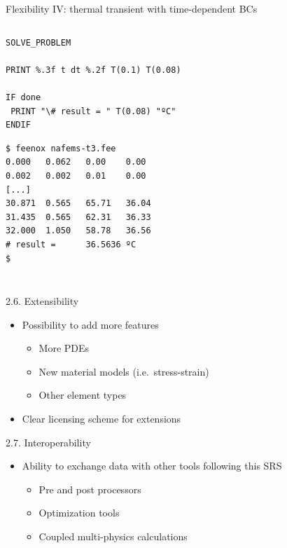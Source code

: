 \documentclass[
  ignorenonframetext,
  aspectratio=169,
]{beamer}
\providecommand{\tightlist}{%
  \setlength{\itemsep}{0pt}\setlength{\parskip}{0pt}}
\begin{document}
\begin{frame}[fragile]{Flexibility IV: thermal transient with
time-dependent BCs}
\begin{columns}[T]
\begin{column}{0.5\textwidth}
\begin{lstlisting}[style=feenox]
SOLVE_PROBLEM

PRINT %.3f t dt %.2f T(0.1) T(0.08) 

IF done
 PRINT "\# result = " T(0.08) "ºC"
ENDIF
\end{lstlisting}

\begin{lstlisting}[style=terminal]
$ feenox nafems-t3.fee 
0.000   0.062   0.00    0.00
0.002   0.002   0.01    0.00
[...]
30.871  0.565   65.71   36.04
31.435  0.565   62.31   36.33
32.000  1.050   58.78   36.56
# result =      36.5636 ºC
$
\end{lstlisting}
\end{column}
\end{columns}
\end{frame}

\begin{frame}{}
\protect\hypertarget{section-8}{}
\begin{columns}[T]
\begin{column}{0.5\textwidth}
\begin{block}{2.6. Extensibility}
\protect\hypertarget{extensibility}{}
\begin{itemize}
\tightlist
\item
  Possibility to add more features

  \begin{itemize}
  \tightlist
  \item
    More PDEs
  \item
    New material models (i.e.~stress-strain)
  \item
    Other element types
  \end{itemize}
\item
  Clear licensing scheme for extensions
\end{itemize}
\end{block}

\begin{block}{2.7. Interoperability}
\protect\hypertarget{interoperability}{}
\begin{itemize}
\tightlist
\item
  Ability to exchange data with other tools following this SRS

  \begin{itemize}
  \tightlist
  \item
    Pre and post processors
  \item
    Optimization tools
  \item
    Coupled multi-physics calculations
  \end{itemize}
\end{itemize}
\end{block}
\end{column}


\end{columns}
\end{frame}
\end{document}
